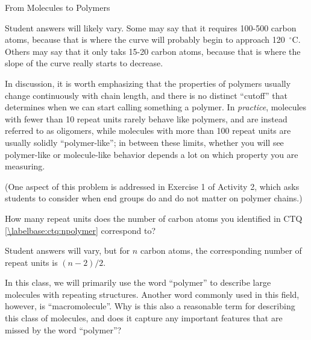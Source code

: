 \begin{activity}{From Molecules to Polymers}
\begin{ctqs}
		\begin{solution}[2in]
		
			Student answers will likely vary.  Some may say that it requires 100-500 carbon atoms, because that is where the curve will probably begin to approach 120~${}^\circ$C.  Others may say that it only taks 15-20 carbon atoms, because that is where the slope of the curve really starts to decrease.
			
			In discussion, it is worth emphasizing that the properties of polymers usually change continuously with chain length, and there is no distinct ``cutoff'' that determines when we can start calling something a polymer.  In \emph{practice}, molecules with fewer than 10 repeat units rarely behave like polymers, and are instead referred to as oligomers, while molecules with more than 100 repeat units are usually solidly ``polymer-like''; in between these limits, whether you will see polymer-like or molecule-like behavior depends a lot on which property you are measuring.
			
			(One aspect of this problem is addressed in Exercise 1 of Activity 2, which asks students to consider when end groups do and do not matter on polymer chains.)
		\end{solution}
	
	
			
\end{ctqs}

		

\begin{exercises}

	\exercise How many repeat units does the number of carbon atoms you identified in CTQ \ref{\labelbase:ctq:npolymer} correspond to?
	
		\begin{solution}
		
			Student answers will vary, but for $n$ carbon atoms, the corresponding number of repeat units is $(n-2)/2$.
			
		\end{solution}

	\exercise In this class, we will primarily use the word ``polymer'' to describe large molecules with repeating structures.  Another word commonly used in this field, however, is ``macromolecule''.  Why is this also a reasonable term for describing this class of molecules, and does it capture any important features that are missed by the word ``polymer''?
	

\end{exercises}
\end{activity}
